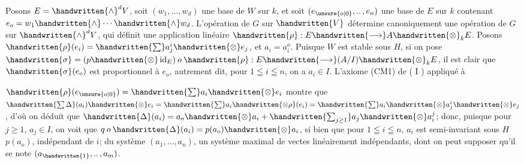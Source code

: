 Posons $E=\handwritten{\wedge}^d V$, soit $(w_1,\ldots,w_d)$ une base de $W$ sur $k$, et soit $(e_{\unsure{o|0}},\mathinner{..},e_n)$ une base de $E$ sur $k$ contenant $e_o=w_1\handwritten{\wedge}\cdots\handwritten{\wedge}w_d$. L'opération de $G$ sur $\handwritten{V}$ détermine canoniquement une opération de $G$ sur $\handwritten{\wedge}^d V$, qui définit une application linéaire $\handwritten{\rho}:E\handwritten{\longrightarrow}A\handwritten{\otimes}_k E$. Posons $\handwritten{\rho}(e_i)=\handwritten{\sum}a_j^i\handwritten{\otimes}e_j$, et $a_i=a_i^o$. Puisque $W$ est stable sous $H$, si on pose $\handwritten{\sigma}=(p\handwritten{\otimes}\operatorname{id}_E)\mathbin{o}\handwritten{\rho}:E\handwritten{\longrightarrow}(A/I)\handwritten{\otimes}_k E$, il est clair que $\handwritten{\sigma}(e_o)$ est proportionnel à $e_o$, autrement dit, pour $1\leqq i\leqq n$, on a $a_i\in I$. L'axiome (CM1) de ( I ) appliqué à

$\handwritten{\rho}(e_{\unsure{o|0}})=\handwritten{\sum}a_i\handwritten{\otimes}e_i$ montre que $\handwritten{\sum\Delta}(a_i)\handwritten{\otimes}e_i=\handwritten{\sum}a_i\handwritten{\otimes\rho}(e_i)=\handwritten{\sum}a_i\handwritten{\otimes}a_j^i\handwritten{\otimes}e_j$, d'où on déduit que $\handwritten{\Delta}(a_i)=a_o\handwritten{\otimes}a_i+\handwritten{\sum_{j\geq1}}a_j\handwritten{\otimes}a_i^j$; donc, puisque pour $j\geq1$, $a_j\in I$, on voit que $q\mathbin{o}\handwritten{\Delta}(a_i)=p(a_o)\handwritten{\otimes}a_i$, si bien que pour $1\leqq i\leqq n$, $a_i$ est semi-invariant sous $H$   $p(a_o)$, indépendant de $i$;  du système $(a_1,\ldots,a_n)$,  un système maximal de vectes linéairement indépendants, dont on peut supposer qu'il se note $(a_{\handwritten{1}},\mathinner{..},a_m)$. 

